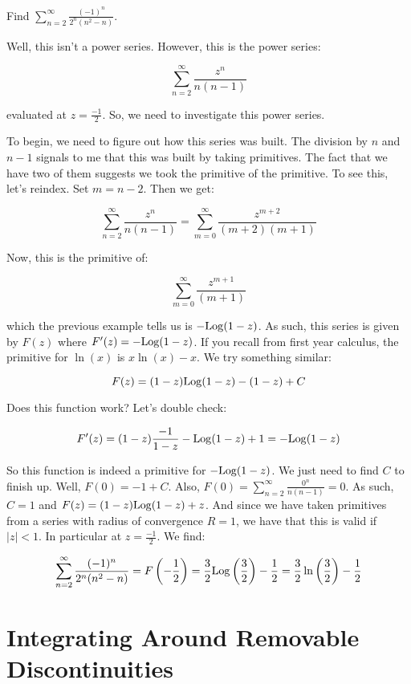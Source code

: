 \begin{ex}{}{} Find $\sum_{n=2}^\infty \frac{(-1)^n}{2^n(n^2 - n)}$. 

Well, this isn't a power series. However, this is the power series:

$$\sum_{n = 2}^\infty \frac{z^n}{n(n-1)}$$

\noin evaluated at $z = \frac{-1}{2}$. So, we need to investigate this power series.

To begin, we need to figure out how this series was built. The division by $n$ and $n-1$ signals to me that this was built by taking primitives. The fact that we have two of them suggests we took the primitive of the primitive. To see this, let's reindex. Set $m = n - 2$. Then we get:

$$\sum_{n = 2}^\infty \frac{z^n}{n(n-1)} = \sum_{m = 0}^\infty \frac{z^{m+2}}{(m+2)(m+1)}$$

Now, this is the primitive of:

$$\sum_{m = 0}^\infty \frac{z^{m+1}}{(m+1)}$$

\noin which the previous example tells us is $-\mathrm{Log}(1-z)$. As such, this series is given by $F(z)$ where $F'(z) = -\mathrm{Log}(1-z)$. If you recall from first year calculus, the primitive for $\ln(x)$ is $x\ln(x) - x$. We try something similar:

$$F(z) = (1-z)\mathrm{Log}(1-z) - (1-z) + C$$

Does this function work? Let's double check:

$$F'(z) = (1-z)\frac{-1}{1-z} - \mathrm{Log}(1-z) + 1 = -\mathrm{Log}(1-z)$$

So this function is indeed a primitive for $-\mathrm{Log}(1-z)$. We just need to find $C$ to finish up. Well, $F(0) = -1 + C$. Also, $F(0) = \sum_{n = 2}^\infty \frac{0^n}{n(n-1)} = 0$. As such, $C = 1$ and $F(z) = (1-z)\mathrm{Log}(1-z)+ z$. And since we have taken primitives from a series with radius of convergence $R = 1$, we have that this is valid if $|z| < 1$. In particular at $z = \frac{-1}{2}$. We find:

$$\sum_{n=2}^\infty \frac{(-1)^n}{2^n(n^2 - n)} = F\left(-\frac{1}{2}\right) = \frac{3}{2}\mathrm{Log}\left(\frac{3}{2}\right) - \frac{1}{2} = \frac{3}{2}\ln\left(\frac{3}{2}\right) - \frac{1}{2}$$
\end{ex}


\section{Integrating Around Removable Discontinuities}

